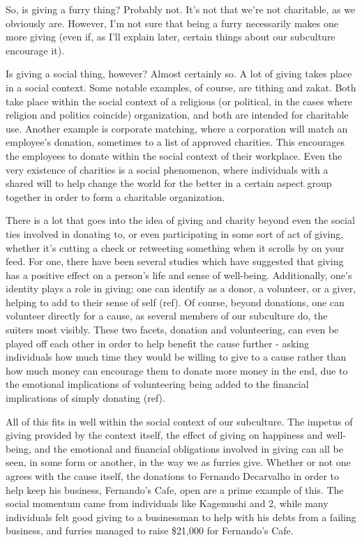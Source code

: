 So, is giving a furry thing? Probably not. It's not that we're not charitable, as we obviously are. However, I'm not sure that being a furry necessarily makes one more giving (even if, as I'll explain later, certain things about our subculture encourage it).

Is giving a social thing, however? Almost certainly so. A lot of giving takes place in a social context. Some notable examples, of course, are tithing and zakat. Both take place within the social context of a religious (or political, in the cases where religion and politics coincide) organization, and both are intended for charitable use. Another example is corporate matching, where a corporation will match an employee's donation, sometimes to a list of approved charities. This encourages the employees to donate within the social context of their workplace. Even the very existence of charities is a social phenomenon, where individuals with a shared will to help change the world for the better in a certain aspect group together in order to form a charitable organization.

There is a lot that goes into the idea of giving and charity beyond even the social ties involved in donating to, or even participating in some sort of act of giving, whether it's cutting a check or retweeting something when it scrolls by on your feed. For one, there have been several studies which have suggested that giving has a positive effect on a person's life and sense of well-being. Additionally, one's identity plays a role in giving; one can identify as a donor, a volunteer, or a giver, helping to add to their sense of self (ref). Of course, beyond donations, one can volunteer directly for a cause, as several members of our subculture do, the suiters most visibly. These two facets, donation and volunteering, can even be played off each other in order to help benefit the cause further - asking individuals how much time they would be willing to give to a cause rather than how much money can encourage them to donate more money in the end, due to the emotional implications of volunteering being added to the financial implications of simply donating (ref).

All of this fits in well within the social context of our subculture. The impetus of giving provided by the context itself, the effect of giving on happiness and well-being, and the emotional and financial obligations involved in giving can all be seen, in some form or another, in the way we as furries give. Whether or not one agrees with the cause itself, the donations to Fernando Decarvalho in order to help keep his business, Fernando's Cafe, open are a prime example of this. The social momentum came from individuals like Kagemushi and 2, while many individuals felt good giving to a businessman to help with his debts from a failing business, and furries managed to raise \$21,000 for Fernando's Cafe.

